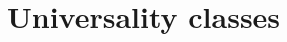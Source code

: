 \documentclass[aps,prl,singlecolumn,nofootinbib]{revtex4-2}
\theoremstyle{definition}
\theoremstyle{theorem}
\begin{document}
\section{Universality classes}
%
\end{document}
